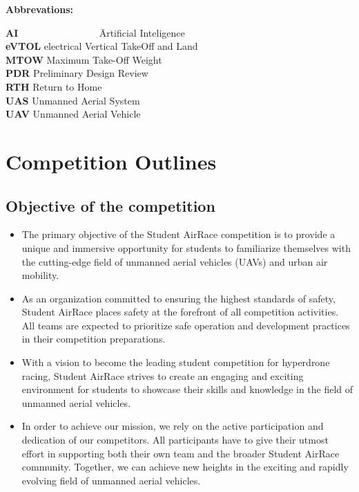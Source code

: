 {\bf Abbrevations:}
\begin{tabbing}
  {\bf AI~~~~~~~~~~~~~~} \= Artificial Inteligence
  \\{\bf eVTOL} \> electrical Vertical TakeOff and Land
  \\{\bf MTOW} \> Maximum Take-Off Weight
  \\{\bf PDR} \> Preliminary Design Review
  \\{\bf RTH} \> Return to Home
  \\{\bf UAS} \> Unmanned Aerial System
  \\{\bf UAV} \> Unmanned Aerial Vehicle
\end{tabbing}




\newpage

\newpage

\section{Competition Outlines}
  
\subsection{Objective of the competition}

\begin{itemize}
  \item The primary objective of the Student AirRace competition is to provide a unique and immersive opportunity for students to familiarize themselves with the cutting-edge field of unmanned aerial vehicles (UAVs) and urban air mobility.
  \item As an organization committed to ensuring the highest standards of safety, Student AirRace places safety at the forefront of all competition activities. All teams are expected to prioritize safe operation and development practices in their competition preparations.
  \item With a vision to become the leading student competition for hyperdrone racing, Student AirRace strives to create an engaging and exciting environment for students to showcase their skills and knowledge in the field of unmanned aerial vehicles.
  \item In order to achieve our mission, we rely on the active participation and dedication of our competitors. All participants have to give their utmost effort in supporting both their own team and the broader Student AirRace community. Together, we can achieve new heights in the exciting and rapidly evolving field of unmanned aerial vehicles.
\end{itemize}

